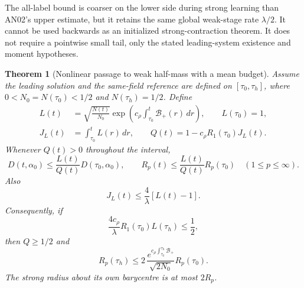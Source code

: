 \documentclass[11pt]{article}
\numberwithin{equation}{section}
\newtheorem{theorem}{Theorem}[section]
\theoremstyle{remark}\newtheorem{remark}[theorem]{Remark}
\newcommand{\dd}{\,d}
\newcommand{\1}{\mathbf 1}
\begin{document}
The all-label bound is coarser on the lower side during strong learning
than AN02's upper estimate, but it retains the same global weak-stage
rate $\lambda/2$. It cannot be used backwards as an initialized
strong-contraction theorem. It does not require a pointwise small tail,
only the stated leading-system existence and moment hypotheses.

\begin{theorem}[Nonlinear passage to weak half-mass with a mean budget]
\label{inc:AN03:ret:v1:halfpassage}
Assume the leading solution and the same-field reference are defined on
$[\tau_0,\tau_h]$, where $0<N_0=N(\tau_0)<1/2$ and $N(\tau_h)=1/2$.
Define
\begin{align}
 L(t)&=\sqrt{\frac{N(t)}{N_0}}
       \exp\left(c_\rho\int_{\tau_0}^t\mathcal B_+(r)\dd r\right),
 \qquad L(\tau_0)=1,\label{inc:AN03:ret:v1:L}\\
 J_L(t)&=\int_{\tau_0}^t L(r)\dd r,
 \qquad Q(t)=1-c_\rho R_1(\tau_0)J_L(t).
 \label{inc:AN03:ret:v1:denominator}
\end{align}
Whenever $Q(t)>0$ throughout the interval,
\begin{equation}\label{inc:AN03:ret:v1:nonlinearG}
 D(t,\alpha_0)\le\frac{L(t)}{Q(t)}D(\tau_0,\alpha_0),
 \qquad
 R_p(t)\le\frac{L(t)}{Q(t)}R_p(\tau_0)
 \quad(1\le p\le\infty).
\end{equation}
Also
\begin{equation}\label{inc:AN03:ret:v1:integralL}
 J_L(t)\le\frac4\lambda[L(t)-1].
\end{equation}
Consequently, if
\begin{equation}\label{inc:AN03:ret:v1:smallness}
 \frac{4c_\rho}{\lambda}R_1(\tau_0)L(\tau_h)\le\frac12,
\end{equation}
then $Q\ge1/2$ and
\begin{equation}\label{inc:AN03:ret:v1:halfradius}
 R_p(\tau_h)\le
 2\,\frac{e^{c_\rho\int_{\tau_0}^{\tau_h}\mathcal B_+}}
          {\sqrt{2N_0}}R_p(\tau_0).
\end{equation}
The strong radius about its own barycentre is at most $2R_p$.
\end{theorem}
\end{document}
